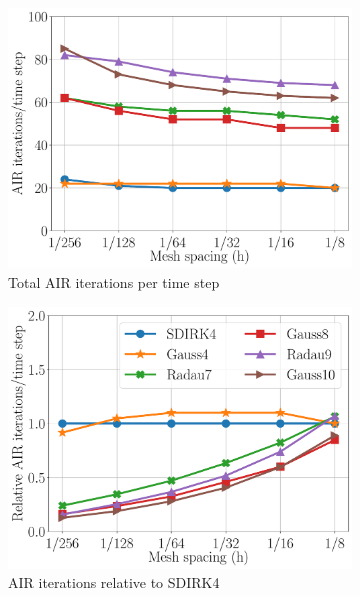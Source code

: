 \documentclass[a4paper,10pt]{article}
\begin{document}
%
\begin{figure}[!h]
  \centering
  \begin{subfigure}[b]{0.475\textwidth}
    \includegraphics[width=\textwidth]{./figures/dg_advdiff_o4_1e-6.pdf}
    \caption{Total AIR iterations per time step}
	\label{fig:dg_o4_abs}
  \end{subfigure}
   \begin{subfigure}[b]{0.475\textwidth}
    \includegraphics[width=\textwidth]{./figures/dg_advdiff_o4_1e-6_rel.pdf}
   \caption{AIR iterations relative to SDIRK4}
	\label{fig:dg_o4_rel}
  \end{subfigure}
\caption{}
  \label{fig:dg_o4}
\end{figure}
%
\end{document}
